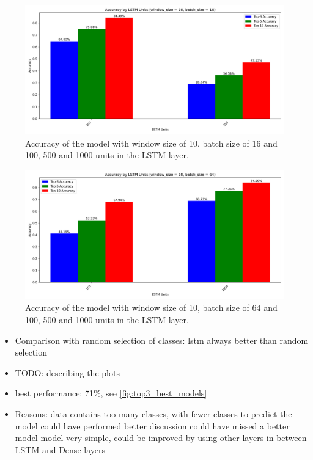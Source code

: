 \begin{figure}[h!]
    \centering
    \includegraphics[scale=0.4]{images/accuracy_by_lstm_units_window_10_batch_16.png}
    \caption{Accuracy of the model with window size of 10, batch size of 16 and 100, 500 and 1000 units in the LSTM layer.}
    \label{fig:window_size10_batch16}
\end{figure}

\begin{figure}[h!]
    \centering
    \includegraphics[scale=0.4]{images/accuracy_by_lstm_units_window_10_batch_64.png}
    \caption{Accuracy of the model with window size of 10, batch size of 64 and 100, 500 and 1000 units in the LSTM layer.}
    \label{fig:window_size10_batch64}
\end{figure}

\begin{itemize}
    \item Comparison with random selection of classes: lstm always better than random selection 
    \item TODO: describing the plots
    \item best performance: 71\%, see \cref{fig:top3_best_models}
    \item Reasons:
    \subitem data contains too many classes, with fewer classes to predict the model could have performed better
    \subitem discussion could have missed a better model
    \subitem model very simple, could be improved by using other layers in between LSTM and Dense layers
  \end{itemize}

